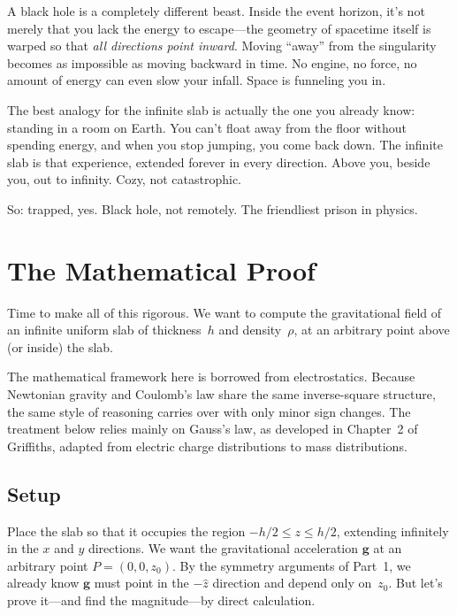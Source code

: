 \documentclass[11pt, letterpaper]{article}
\begin{document}
A black hole is a completely different beast. Inside the event horizon, it's not merely that you lack the energy to escape---the geometry of spacetime itself is warped so that \textit{all directions point inward}. Moving ``away'' from the singularity becomes as impossible as moving backward in time. No engine, no force, no amount of energy can even slow your infall. Space is funneling you in.

The best analogy for the infinite slab is actually the one you already know: standing in a room on Earth. You can't float away from the floor without spending energy, and when you stop jumping, you come back down. The infinite slab is that experience, extended forever in every direction. Above you, beside you, out to infinity. Cozy, not catastrophic.

So: trapped, yes. Black hole, not remotely. The friendliest prison in physics.



\section{The Mathematical Proof}

Time to make all of this rigorous. We want to compute the gravitational field of an infinite uniform slab of thickness~$h$ and density~$\rho$, at an arbitrary point above (or inside) the slab.

The mathematical framework here is borrowed from electrostatics. Because Newtonian gravity and Coulomb's law share the same inverse-square structure, the same style of reasoning carries over with only minor sign changes. The treatment below relies mainly on Gauss's law, as developed in Chapter~2 of Griffiths, adapted from electric charge distributions to mass distributions.

\subsection{Setup}

Place the slab so that it occupies the region $-h/2 \leq z \leq h/2$, extending infinitely in the $x$ and $y$ directions. We want the gravitational acceleration $\mathbf{g}$ at an arbitrary point $P = (0, 0, z_0)$. By the symmetry arguments of Part~1, we already know $\mathbf{g}$ must point in the $-\hat{z}$ direction and depend only on~$z_0$. But let's prove it---and find the magnitude---by direct calculation.
\end{document}
